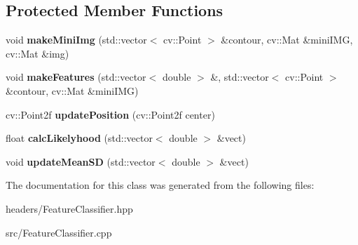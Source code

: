 \subsection*{Protected Member Functions}
\begin{DoxyCompactItemize}
\item 
\hypertarget{classFeatureClassifier_a2ca27db91b6f241c680f37409402bc58}{void {\bfseries make\-Mini\-Img} (std\-::vector$<$ cv\-::\-Point $>$ \&contour, cv\-::\-Mat \&mini\-I\-M\-G, cv\-::\-Mat \&img)}\label{classFeatureClassifier_a2ca27db91b6f241c680f37409402bc58}

\item 
\hypertarget{classFeatureClassifier_ae742d63d70d0621b5c7fba21336d0b6b}{void {\bfseries make\-Features} (std\-::vector$<$ double $>$ \&, std\-::vector$<$ cv\-::\-Point $>$ \&contour, cv\-::\-Mat \&mini\-I\-M\-G)}\label{classFeatureClassifier_ae742d63d70d0621b5c7fba21336d0b6b}

\item 
\hypertarget{classFeatureClassifier_abdb6cbcaa98db6bfad9d520712790172}{cv\-::\-Point2f {\bfseries update\-Position} (cv\-::\-Point2f center)}\label{classFeatureClassifier_abdb6cbcaa98db6bfad9d520712790172}

\item 
\hypertarget{classFeatureClassifier_afb99e30afeb76f0fc015f77ceaea6b83}{float {\bfseries calc\-Likelyhood} (std\-::vector$<$ double $>$ \&vect)}\label{classFeatureClassifier_afb99e30afeb76f0fc015f77ceaea6b83}

\item 
\hypertarget{classFeatureClassifier_afabb0d18b79b81103ec01fe8f653b2b3}{void {\bfseries update\-Mean\-S\-D} (std\-::vector$<$ double $>$ \&vect)}\label{classFeatureClassifier_afabb0d18b79b81103ec01fe8f653b2b3}

\end{DoxyCompactItemize}


The documentation for this class was generated from the following files\-:\begin{DoxyCompactItemize}
\item 
headers/Feature\-Classifier.\-hpp\item 
src/Feature\-Classifier.\-cpp\end{DoxyCompactItemize}
